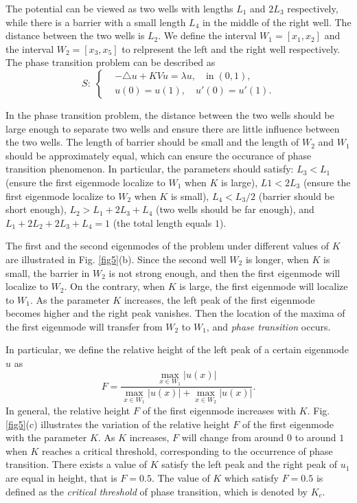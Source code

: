 \documentclass[a4paper,11pt]{article}
\begin{document}
The potential can be viewed as two wells with lengths $L_1$ and $2 L_3$ respectively, while there is a barrier with a small length $L_4$ in the middle of the right well. The distance between the two wells is $L_2$. We define the interval $W_1 = [x_1, x_2]$ and the interval $W_2 = [x_3, x_5]$ to relpresent the left and the right well respectively. The phase transition problem can be described as
\begin{equation}
S: \;
\left\{
\begin{split}
& -\triangle u + K V u = \lambda u, \quad \textrm{in} \; (0, 1), \\
& u(0) = u(1), \quad u'(0) =  u'(1).
\end{split}
\right.
\end{equation}

In the phase transition problem, the distance between the two wells should be large enough to separate two wells and ensure there are little influence between the two wells. The length of barrier should be small and the length of $W_2$ and $W_1$ should be approximately equal, which can ensure the occurance of phase transition phenomenon. In particular, the parameters should satisfy: $L_3 < L_1$ (ensure the first eigenmode localize to $W_1$ when $K$ is large), $L1 < 2 L_3$ (ensure the first eigenmode localize to $W_2$ when $K$ is small), $L_4 < L_3 / 2$ (barrier should be short enough), $L_2 > L_1 + 2 L_3 + L_4$ (two wells should be far enough), and $L_1 + 2 L_2 + 2 L_3 + L_4 = 1$ (the total length equals $1$).

The first and the second eigenmodes of the problem under different values of $K$ are illustrated in Fig. \ref{fig5}(b). Since the second well $W_2$ is longer, when $K$ is small, the barrier in $W_2$ is not strong enough, and then the first eigenmode will localize to $W_2$. On the contrary, when $K$ is large, the first eigenmode will localize to $W_1$. As the parameter $K$ increases, the left peak of the first eigenmode becomes higher and the right peak vanishes. Then the location of the maxima of the first eigenmode will transfer from $W_2$ to $W_1$, and \emph{phase transition} occurs.

In particular, we define the relative height of the left peak of a certain eigenmode $u$ as 
\begin{equation}
F = \frac{\max_{x \in W_1} |u(x)|}{\max_{x \in W_1} |u(x)| + \max_{x \in W_2} |u(x)|}.
\end{equation}
In general, the relative height $F$ of the first eigenmode increases with $K$. Fig. \ref{fig5}(c) illustrates the variation of the relative height $F$ of the first eigenmode with the parameter $K$. As $K$ increases, $F$ will change from around $0$ to around $1$ when $K$ reaches a critical threshold, corresponding to the occurrence of phase transition. There exists a value of $K$ satisfy the left peak and the right peak of $u_1$ are equal in height, that is $F = 0.5$. The value of $K$ which satisfy $F = 0.5$ is defined as the \emph{critical threshold} of phase transition, which is denoted by $K_c$.
\end{document}
